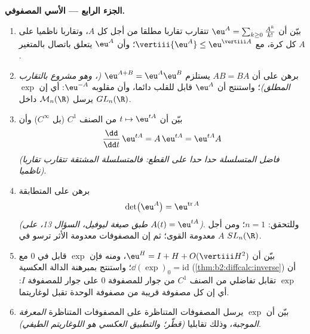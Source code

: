 \begin{problem}
\medskip
\noindent\textbf{الجزء الرابع --- الأسي المصفوفي.}
\begin{enumerate}[resume]
  \item بيّن أن $\eu^A = \sum_{k\geq0}\frac{A^k}{k!}$ تتقارب تقاربا مطلقا من أجل كل $A$، وتقاربا
        ناظميا على كل كرة، مع $\vertiii{\eu^A} \leq
        \eu^{\vertiii A}$؛ وأن $\eu^A$ يتعلق باتصال
        بالمتغير $A$.
  \item برهن على أن $AB = BA$ يستلزم $\eu^{A+B} =
        \eu^A\eu^B$ \emph{(، وهو مشروع
        بالتقارب المطلق)}؛ واستنتج أن $\eu^A$ قابل للقلب دائما، وأن
        مقلوبه $\eu^{-A}$: أي إن $\exp$ يرسل $\mathcal M_n(\R)$ داخل $GL_n(\R)$.
  \item بيّن أن $t \mapsto \eu^{tA}$ من الصنف $C^1$ (بل $C^\infty$) وأن
        \[
        \frac{\dd}{\dd t}\,\eu^{tA} = A\,\eu^{tA} =
        \eu^{tA}A
        \]
        \emph{(فاضل المتسلسلة حدا حدا على القطع: فالمتسلسلة المشتقة
        تتقارب تقاربا ناظميا)}.
  \item برهن على المتطابقة
        \[
        \det\bigl(\eu^{A}\bigr) = \eu^{\operatorname{tr}A}
        \]
        \emph{(طبق صيغة ليوفيل، السؤال 13، على $A(t) = \eu^{tA}$)}. وللتحقق:
        $n = 1$؛ ومن أجل $A$ معدومة القوى؛ ثم إن المصفوفات معدومة
        الأثر ترسو في $SL_n(\R)$.
  \item بيّن أن $\eu^H = I + H + O(\vertiii H^2)$، ومنه فإن $\exp$ قابل  في $0$ مع
        $\dd(\exp)_0 =
        \mathrm{id}$؛ واستنتج بمبرهنة الدالة العكسية (\cref{thm:b2:diffcalc:inverse}) أن $\exp$
        تقابل تفاضلي من الصنف $C^1$ من جوار للمصفوفة $0$ على
        جوار للمصفوفة $I$: أي إن كل مصفوفة قريبة من مصفوفة الوحدة
        تقبل لوغاريتما.
  \item بيّن أن $\exp$ يرسل المصفوفات المتناظرة على المصفوفات
        المتناظرة \emph{المعرفة الموجبة}، وذلك تقابليا \emph{(قطّر؛
        والتطبيق العكسي هو اللوغاريتم الطيفي)}.
\end{enumerate}


\end{problem}
